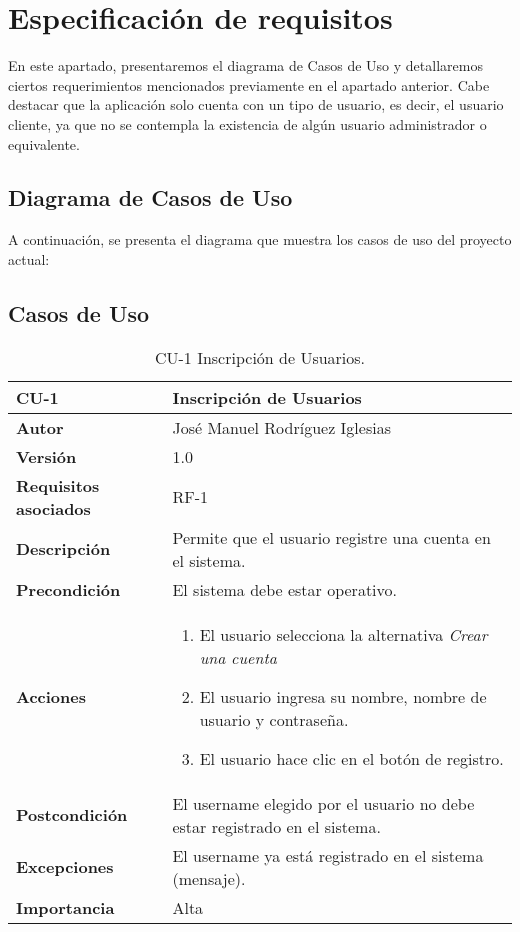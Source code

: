 \section{Especificación de requisitos}

En este apartado, presentaremos el diagrama de Casos de Uso y detallaremos ciertos requerimientos mencionados previamente en el apartado anterior. Cabe destacar que la aplicación solo cuenta con un tipo de usuario, es decir, el usuario cliente, ya que no se contempla la existencia de algún usuario administrador o equivalente.

\subsection{Diagrama de Casos de Uso}
A continuación, se presenta el diagrama que muestra los casos de uso del proyecto actual:


\subsection{Casos de Uso}
\begin{table}[h]
	\centering
	\begin{tabularx}{\linewidth}{ p{} p{} }
		\toprule
		\textbf{CU-1}    & \textbf{Inscripción de Usuarios}\\
		\toprule
            \textbf{Autor}                & José Manuel Rodríguez Iglesias \\
		\textbf{Versión}              & 1.0    \\
		\textbf{Requisitos asociados} & RF-1\\
		\textbf{Descripción}          & Permite que el usuario registre una cuenta en el sistema. \\
		\textbf{Precondición}         & El sistema debe estar operativo. \\
		\textbf{Acciones}             &
		\begin{enumerate}
			\def\labelenumi{\arabic{enumi}.}
			\tightlist
			\item El usuario selecciona la alternativa \textit{Crear una cuenta} 
			\item El usuario ingresa su nombre, nombre de usuario y contraseña.
			\item El usuario hace clic en el botón de registro.
		\end{enumerate}\\
		\textbf{Postcondición}        &  El username elegido por el usuario no debe estar registrado en el sistema.\\
		\textbf{Excepciones}          & El username ya está registrado en el sistema (mensaje).\\
		\textbf{Importancia}          & Alta\\
		\bottomrule
	\end{tabularx}
	\caption{CU-1 Inscripción de Usuarios.}
\end{table}

